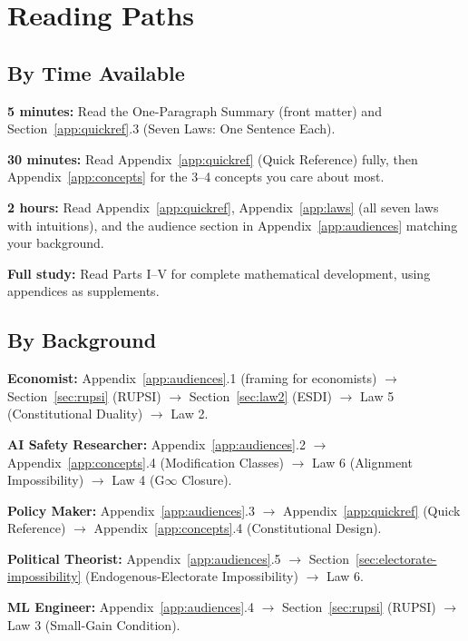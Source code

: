 \documentclass[12pt]{article}
\begin{document}

\section{Reading Paths}
\label{app:reading}

\subsection{By Time Available}

\textbf{5 minutes:} Read the One-Paragraph Summary (front matter) and Section~\ref{app:quickref}.3 (Seven Laws: One Sentence Each).

\textbf{30 minutes:} Read Appendix~\ref{app:quickref} (Quick Reference) fully, then Appendix~\ref{app:concepts} for the 3--4 concepts you care about most.

\textbf{2 hours:} Read Appendix~\ref{app:quickref}, Appendix~\ref{app:laws} (all seven laws with intuitions), and the audience section in Appendix~\ref{app:audiences} matching your background.

\textbf{Full study:} Read Parts I--V for complete mathematical development, using appendices as supplements.

\subsection{By Background}

\textbf{Economist:} Appendix~\ref{app:audiences}.1 (framing for economists) $\to$ Section~\ref{sec:rupsi} (RUPSI) $\to$ Section~\ref{sec:law2} (ESDI) $\to$ Law 5 (Constitutional Duality) $\to$ Law 2.

\textbf{AI Safety Researcher:} Appendix~\ref{app:audiences}.2 $\to$ Appendix~\ref{app:concepts}.4 (Modification Classes) $\to$ Law 6 (Alignment Impossibility) $\to$ Law 4 (G$\infty$ Closure).

\textbf{Policy Maker:} Appendix~\ref{app:audiences}.3 $\to$ Appendix~\ref{app:quickref} (Quick Reference) $\to$ Appendix~\ref{app:concepts}.4 (Constitutional Design).

\textbf{Political Theorist:} Appendix~\ref{app:audiences}.5 $\to$ Section~\ref{sec:electorate-impossibility} (Endogenous-Electorate Impossibility) $\to$ Law 6.

\textbf{ML Engineer:} Appendix~\ref{app:audiences}.4 $\to$ Section~\ref{sec:rupsi} (RUPSI) $\to$ Law 3 (Small-Gain Condition).
\end{document}
